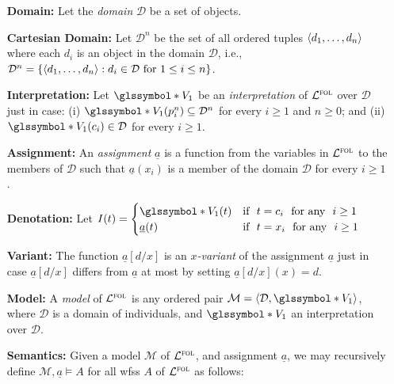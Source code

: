 \documentclass[a4paper, 11pt]{article} %
\newcommand{\g}{\glssymbol*}%
\begin{document}
\begin{enumerate}[leftmargin=1.2in,labelsep=.15in] %
\item[\bf Domain:] Let the \textit{domain} $\mathcal{D}$ be a set of objects.%
\item[\bf Cartesian Domain:] Let $\mathcal{D}^n$ be the set of all ordered tuples $\langle d_1,\dots,d_n\rangle$ where each $d_i$ is an object in the domain $\mathcal{D}$, i.e., $\mathcal{D}^n=\lbrace\langle d_1,\dots,d_n\rangle:d_i\in\mathcal{D}~\text{for}~1\leq i\leq n\rbrace$.
\item[\bf Interpretation:] Let $\g{V}_1$ be an \textit{interpretation} of $\mathcal{L}^{\textsc{fol}}$ over $\mathcal{D}$ just in case: (i) $\g{V}_1(p_i^n)\subseteq\mathcal{D}^n$ for every $i\geq1$ and $n\geq0$; and (ii) $\g{V}_1(c_i)\in\mathcal{D}$ for every $i\geq1$.
\item[\bf Assignment:] An \textit{assignment} $\underline{a}$ is a function from the variables in $\mathcal{L}^{\textsc{fol}}$ to the members of $\mathcal{D}$ such that $\underline{a}(x_i)$ is a member of the domain $\mathcal{D}$ for every $i\geq1$.
\item[\bf Denotation:] Let $I(t)=
	\begin{cases} 
		\g{V}_1(t) & \text{if}~~ t=c_i ~~\text{for any}~~ i\geq1\\
		\underline{a}(t) & \text{if}~~ t=x_i ~~\text{for any}~~ i\geq1
	\end{cases}$
\item[\bf Variant:] The function $\underline{a}[d/x]$ is an \textit{$x$-variant} of the assignment $\underline{a}$ just in case $\underline{a}[d/x]$ differs from $\underline{a}$ at most by setting $\underline{a}[d/x](x)=d$.
\item[\bf Model:] A \textit{model} of $\mathcal{L}^{\textsc{fol}}$ is any ordered pair $\mathcal{M}=\tuple{\mathcal{D},\g{V}_1}$, where $\mathcal{D}$ is a domain of individuals, and $\g{V}_1$ an interpretation over $\mathcal{D}$.
\item[\bf Semantics:] Given a model $\mathcal{M}$ of $\mathcal{L}^{\textsc{fol}}$, and assignment $\underline{a}$, we may recursively define $\mathcal{M},\underline{a}\vDash A$ for all wfss $A$ of $\mathcal{L}^{\textsc{fol}}$ as follows:
\begin{small}
\begin{itemize}[leftmargin=.36in]

\end{itemize}
\end{small}
\end{enumerate}
\end{document}
